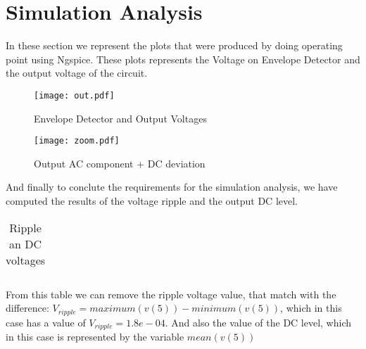 \section{Simulation Analysis}
\label{sec:simulation} 

\par In these section we represent the plots that were produced by doing operating point using Ngspice. These plots represents the Voltage on Envelope Detector and the output voltage of the circuit.


\begin{figure} [!htb] 
  \texttt{[image: out.pdf]}
  \caption{Envelope Detector and Output Voltages}
  \label{fig:theoplots}
  \endminipage\hfill
\end{figure}



\begin{figure} [!htb]
  \texttt{[image: zoom.pdf]}
  \caption{Output AC component + DC deviation}
  \label{fig:theoplots}
  \endminipage\hfill
\end{figure}


\par And finally to conclute the requirements for the simulation analysis, we have computed the results of the voltage ripple and the output DC level.  

\FloatBarrier
\begin{table}[h]
  \centering
  \begin{tabular}{|c|c|c|}
    \hline    
    
    \hline
  \end{tabular}
  \caption{Ripple an DC voltages}
  \label{tab:Octave}
\end{table}
\FloatBarrier  

From this table we can remove the ripple voltage value, that match with the difference: $V_{ripple}=maximum(v(5))-minimum(v(5))$, which in this case has a value of $V_{ripple}=1.8e-04$. And also the value of the DC level, which in this case is represented by the variable $mean(v(5))$


